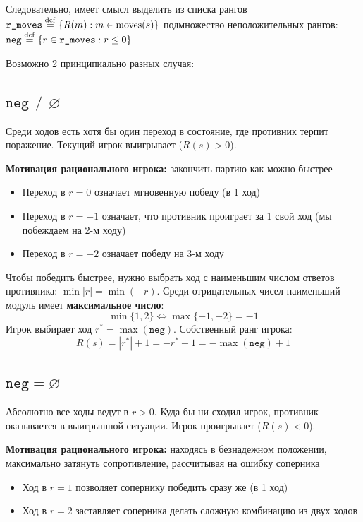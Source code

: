 \documentclass[11pt,a4paper]{article}
\begin{document}
Следовательно, имеет смысл выделить из списка рангов $\texttt{r\_moves} \overset{\mathrm{def}}{=} \{R(m): m \in \text{moves}(s)\}$ подмножество неположительных рангов: $\texttt{neg} \overset{\mathrm{def}}{=} \{r \in \texttt{r\_moves} : r \le 0\}$

Возможно 2 принципиально разных случая:

\subsection{$\texttt{neg} \ne \varnothing$}

Среди ходов есть хотя бы один переход в состояние, где противник терпит поражение. Текущий игрок выигрывает ($R(s) > 0$).

\textbf{Мотивация рационального игрока:} закончить партию как можно быстрее
\begin{itemize}
    \item Переход в $r = 0$ означает мгновенную победу (в 1 ход)
    \item Переход в $r = -1$ означает, что противник проиграет за 1 свой ход (мы побеждаем на 2-м ходу)
    \item Переход в $r = -2$ означает победу на 3-м ходу
\end{itemize}

Чтобы победить быстрее, нужно выбрать ход с наименьшим числом ответов противника: $\min |r| = \min (-r)$. Среди отрицательных чисел наименьший модуль имеет \textbf{максимальное число}:
$$\min \{1, 2\} \iff \max \{-1, -2\} = -1$$
Игрок выбирает ход $r^* = \max(\texttt{neg})$. Собственный ранг игрока:
$$R(s) = |r^*| + 1 = -r^* + 1 = -\max(\texttt{neg}) + 1$$

\subsection{$\texttt{neg} = \varnothing$}

Абсолютно все ходы ведут в $r > 0$. Куда бы ни сходил игрок, противник оказывается в выигрышной ситуации. Игрок проигрывает ($R(s) < 0$).

\textbf{Мотивация рационального игрока:} находясь в безнадежном положении, максимально затянуть сопротивление, рассчитывая на ошибку соперника
\begin{itemize}
    \item Ход в $r = 1$ позволяет сопернику победить сразу же (в 1 ход)
    \item Ход в $r = 2$ заставляет соперника делать сложную комбинацию из двух ходов
\end{itemize}
\end{document}
